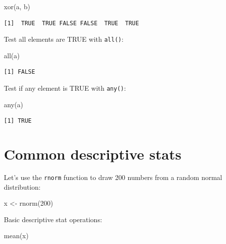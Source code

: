 \documentclass[
]{book}
\newenvironment{Shaded}{\begin{snugshade}}{\end{snugshade}}
\newcommand{\DecValTok}[1]{\textcolor[rgb]{0.00,0.00,0.81}{#1}}
\newcommand{\FunctionTok}[1]{\textcolor[rgb]{0.00,0.00,0.00}{#1}}
\newcommand{\NormalTok}[1]{#1}
\newcommand{\OtherTok}[1]{\textcolor[rgb]{0.56,0.35,0.01}{#1}}
\begin{document}
\begin{Shaded}
\begin{Highlighting}[]
\FunctionTok{xor}\NormalTok{(a, b)}
\end{Highlighting}
\end{Shaded}

\begin{verbatim}
[1]  TRUE  TRUE FALSE FALSE  TRUE  TRUE
\end{verbatim}

Test all elements are TRUE with \texttt{all()}:

\begin{Shaded}
\begin{Highlighting}[]
\FunctionTok{all}\NormalTok{(a)}
\end{Highlighting}
\end{Shaded}

\begin{verbatim}
[1] FALSE
\end{verbatim}

Test if any element is TRUE with \texttt{any()}:

\begin{Shaded}
\begin{Highlighting}[]
\FunctionTok{any}\NormalTok{(a)}
\end{Highlighting}
\end{Shaded}

\begin{verbatim}
[1] TRUE
\end{verbatim}

\hypertarget{common-descriptive-stats}{%
\section{Common descriptive stats}\label{common-descriptive-stats}}

Let's use the \texttt{rnorm} function to draw 200 numbers from a random normal distribution:

\begin{Shaded}
\begin{Highlighting}[]
\NormalTok{x }\OtherTok{\textless{}{-}} \FunctionTok{rnorm}\NormalTok{(}\DecValTok{200}\NormalTok{)}
\end{Highlighting}
\end{Shaded}

Basic descriptive stat operations:

\begin{Shaded}
\begin{Highlighting}[]
\FunctionTok{mean}\NormalTok{(x)}
\end{Highlighting}
\end{Shaded}
\end{document}
